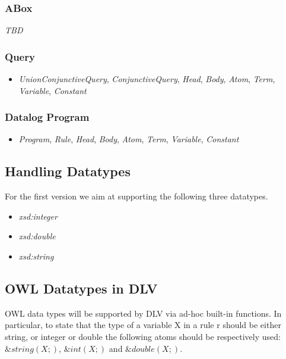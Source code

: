 \documentclass[oneside]{book}
\begin{document}
\subsubsection{ABox}
\textit{TBD}

\subsubsection{Query}
\begin{itemize}
	
	\item  \textit{UnionConjunctiveQuery},  \textit{ConjunctiveQuery},  \textit{Head},  \textit{Body},  \textit{Atom},  \textit{Term},  \textit{Variable},  \textit{Constant}
\end{itemize}


\subsubsection{Datalog Program}
\begin{itemize}
	
	\item  \textit{Program},  \textit{Rule},  \textit{Head},  \textit{Body},  \textit{Atom},  \textit{Term},  \textit{Variable},  \textit{Constant}
\end{itemize}


\subsection{Handling Datatypes}

For the first version we aim at supporting the following three datatypes.

\begin{itemize}
	\item \textit{xsd:integer}
	\item \textit{xsd:double}
	\item \textit{xsd:string}
\end{itemize}




\subsection{OWL Datatypes in DLV}
OWL data types will be supported by DLV via ad-hoc built-in functions. In particular, to state that the type of a variable X in a rule r should be either string, or integer or double the following atoms should be respectively used: $\&string(X;)$, $\&int(X;)$ and $\&double(X;)$. 
\end{document}
